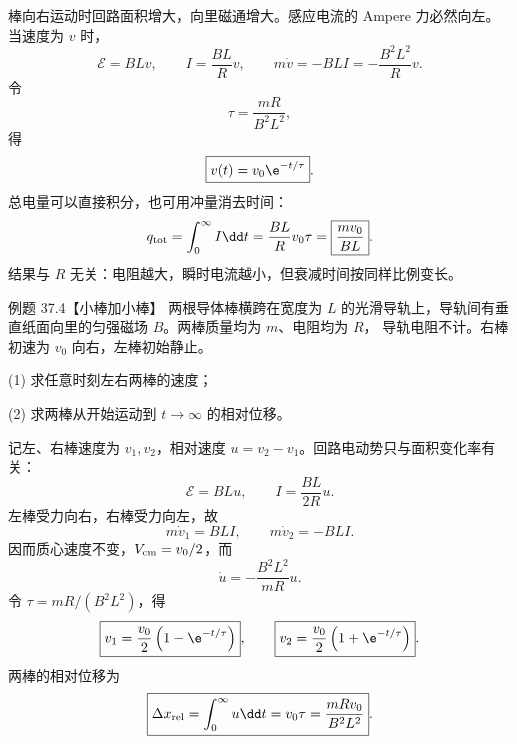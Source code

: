 \begin{xesolution}
棒向右运动时回路面积增大，向里磁通增大。感应电流的 Ampere 力必然向左。当速度为 $v$ 时，
\begin{equation}
  \mathcal E=BLv,
  \qquad I=\frac{BL}{R}v,
  \qquad m\dot v=-BLI=-\frac{B^2L^2}{R}v.
\end{equation}
令
\begin{equation}
  \tau=\frac{mR}{B^2L^2},
\end{equation}
得
\begin{equation}
  \boxed{v(t)=v_0\e^{-t/\tau}}.
\end{equation}
总电量可以直接积分，也可用冲量消去时间：
\begin{equation}
  q_{\rm tot}=\int_0^\infty I\dd t
  =\frac{BL}{R}v_0\tau
  =\boxed{\frac{mv_0}{BL}}.
\end{equation}
结果与 $R$ 无关：电阻越大，瞬时电流越小，但衰减时间按同样比例变长。

\rodResistorDiagram
\end{xesolution}

\Needspace{0.12\textheight}
\begin{origexamplebox}{例题 37.4【小棒加小棒】}
两根导体棒横跨在宽度为 $L$ 的光滑导轨上，导轨间有垂直纸面向里的匀强磁场 $B$。两棒质量均为 $m$、电阻均为 $R$，
导轨电阻不计。右棒初速为 $v_0$ 向右，左棒初始静止。

(1) 求任意时刻左右两棒的速度；

(2) 求两棒从开始运动到 $t\to\infty$ 的相对位移。
\end{origexamplebox}

\begin{xesolution}
记左、右棒速度为 $v_1,v_2$，相对速度 $u=v_2-v_1$。回路电动势只与面积变化率有关：
\begin{equation}
  \mathcal E=BLu,
  \qquad I=\frac{BL}{2R}u.
\end{equation}
左棒受力向右，右棒受力向左，故
\begin{equation}
  m\dot v_1=BLI,
  \qquad m\dot v_2=-BLI.
\end{equation}
因而质心速度不变，$V_{\rm cm}=v_0/2$，而
\begin{equation}
  \dot u=-\frac{B^2L^2}{mR}u.
\end{equation}
令 $\tau=mR/(B^2L^2)$，得
\begin{equation}
  \boxed{v_1=\frac{v_0}{2}\left(1-\e^{-t/\tau}\right)},
  \qquad
  \boxed{v_2=\frac{v_0}{2}\left(1+\e^{-t/\tau}\right)}.
\end{equation}
两棒的相对位移为
\begin{equation}
  \boxed{\Delta x_{\rm rel}=\int_0^\infty u\dd t
  =v_0\tau=\frac{mRv_0}{B^2L^2}}.
\end{equation}

\twoRodDiagram
\end{xesolution}

